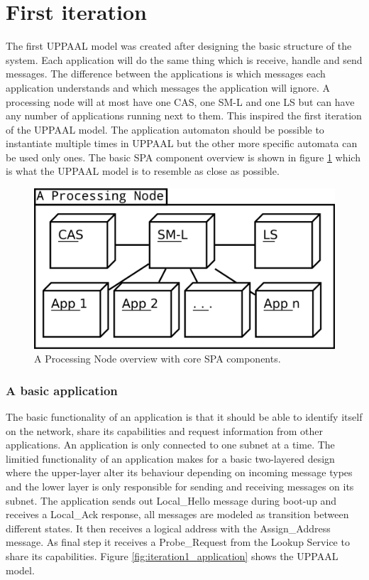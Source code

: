 \section{First iteration}
The first UPPAAL model was created after designing the basic structure of the
system. Each application will do the same thing which is receive, handle
and send messages. The difference between the applications is which
messages each application understands and which messages the application will
ignore. A processing node will at most have one CAS, one SM-L and one LS
but can have any number of applications running next to them. This inspired the
first iteration of the UPPAAL model. The application automaton should be
possible to instantiate multiple times in UPPAAL but the other more specific
automata can be used only ones. The basic SPA component overview is shown in
figure \ref{fig:processing_node_overview} which is what the UPPAAL model is to
resemble as close as possible.

\begin{figure}[h]
    \centering
    \includegraphics[width=\textwidth]{figures/processing_node_overview}
    \caption{A Processing Node overview with core SPA components.}
    \label{fig:processing_node_overview}
\end{figure}

\subsubsection{A basic application}
The basic functionality of an application is that it should be able to identify
itself on the network, share its capabilities and request information from
other applications. An application is only connected to one subnet at a time.
The limitied functionality of an application makes for a basic two-layered
design where the upper-layer alter its behaviour depending on incoming
message types and the lower layer is only responsible for sending and receiving
messages on its subnet. The application sends out Local\_Hello message during
boot-up and receives a Local\_Ack response, all messages are modeled as
transition between different states. It then receives a logical address with
the Assign\_Address message. As final step it receives a Probe\_Request from
the Lookup Service to share its capabilities. Figure
\ref{fig:iteration1_application} shows the UPPAAL model.

